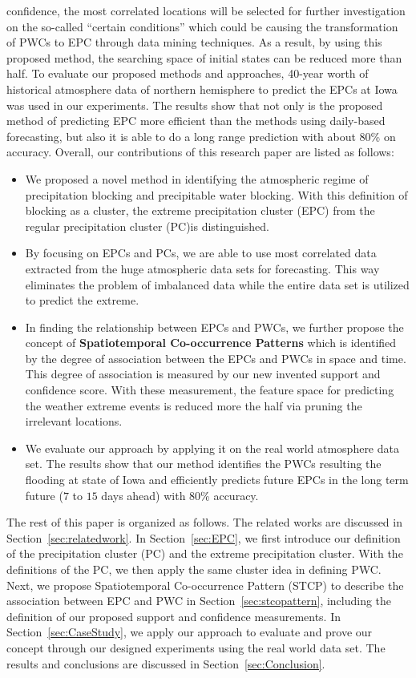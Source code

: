 \documentclass{acm_proc_article-sp}
\begin{document}
confidence, the most correlated locations will be selected for further
investigation on the so-called ``certain conditions'' which could be causing the
transformation of PWCs to EPC through data mining techniques. As a result, by using this proposed method, the searching space of initial states can be reduced more than half.
\newline
To evaluate our proposed methods and approaches, 40-year worth of
historical atmosphere data of northern hemisphere to predict the EPCs at
Iowa was used in our experiments. The results show that not only is the proposed method
of predicting EPC more efficient than the methods using daily-based
forecasting, but also it is able to do a long range prediction with about 80\% on
accuracy.
\newline Overall, our contributions of this research paper are listed as
follows:
\begin{itemize}
\item We proposed a novel method in identifying the atmospheric regime of
precipitation blocking and precipitable water blocking. With this
definition of blocking as a cluster, the extreme precipitation cluster (EPC) from the regular precipitation cluster (PC)is distinguished. 
\item By focusing on EPCs and PCs, we are able to use most correlated data
extracted from the huge atmospheric data sets for forecasting. This way
eliminates the problem of imbalanced data while the entire data set is utilized to
predict the extreme.
\item In finding the relationship between EPCs and PWCs, we further propose
the concept of \textbf{Spatiotemporal Co-occurrence Patterns} which is
identified by the degree of association between the EPCs and PWCs in space and
time. This degree of association is measured by our new invented support and
confidence score. With these measurement, the feature
space for predicting the weather extreme events is reduced more the half via pruning the
irrelevant locations.
\item We evaluate our approach by applying it on the real world atmosphere data
set. The results show that our method identifies the PWCs resulting the
flooding at state of Iowa and efficiently predicts future EPCs in the long
term future ($7$ to $15$ days ahead) with 80\% accuracy.
\end{itemize}
 The rest of this paper is organized as follows. The related works are
discussed in Section~\ref{sec:relatedwork}. In Section~\ref{sec:EPC}, we first
introduce our definition of the precipitation cluster (PC) and the
extreme precipitation cluster. With the definitions of the PC, we then apply the
same cluster idea in defining PWC. Next, we propose Spatiotemporal
Co-occurrence Pattern (STCP) to describe the association between EPC and PWC in
Section~\ref{sec:stcopattern}, including the definition of our proposed
support and confidence measurements. In Section~\ref{sec:CaseStudy}, we
apply our approach to evaluate and prove our concept through our designed
experiments using the real world data set. The results and conclusions are
discussed in Section~\ref{sec:Conclusion}.
\end{document}
